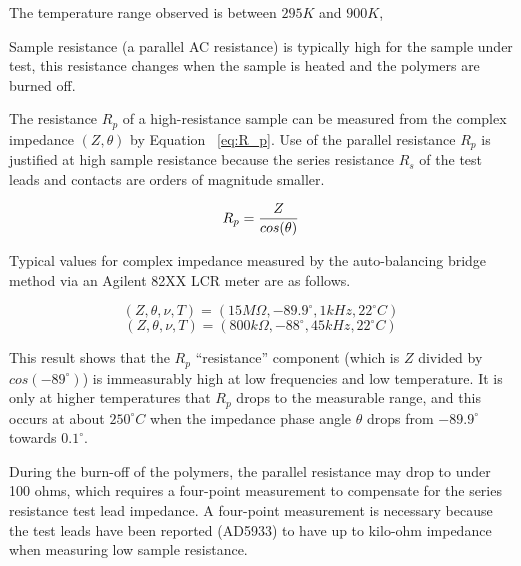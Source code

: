 \documentclass[12pt,oneside,english]{article}
\begin{document}
	The temperature range observed is between $295K$ and $900K$, 
	
	Sample resistance (a parallel AC resistance) is typically high for the sample under test, this resistance changes when the sample is heated and the polymers are burned off.  

	The resistance $R_p$ of a high-resistance sample can be measured from the complex impedance $(Z,\theta)$ by Equation ~\ref{eq:R_p}.  Use of the parallel resistance $R_p$ is justified at high sample resistance because the series resistance $R_s$ of the test leads and contacts are orders of magnitude smaller.
	
	\begin{equation}
		R_p = {{Z} \over {cos({\theta})}}
		\label{eq:R_p}
	\end{equation}
	
	Typical values for complex impedance measured by the auto-balancing bridge method via an Agilent 82XX LCR meter are as follows.
	
	\begin{equation}
		\left( Z,\theta,\nu,T \right) = \left( 15 M\Omega, -89.9^\circ, 1kHz, 22^{\circ}C \right)
	\end{equation}
	\begin{equation}
		\left( Z, \theta, \nu, T \right) = \left( 800 k\Omega, -88^\circ, 45kHz, 22^{\circ}C \right)
	\end{equation}
	
	This result shows that the $R_p$ ``resistance'' component (which is $Z$ divided by $cos(-89^\circ)$) is immeasurably high at low frequencies and low temperature.  It is only at higher temperatures that $R_p$ drops to the measurable range, and this occurs at about $250^{\circ}C$ when the impedance phase angle $\theta$ drops from $-89.9^\circ$ towards $0.1^\circ$.
	
	During the burn-off of the polymers, the parallel resistance may drop to under 100 ohms, which requires a four-point measurement to compensate for the series resistance test lead impedance.
	A four-point measurement is necessary because the test leads have been reported (AD5933) to have up to kilo-ohm impedance when measuring low sample resistance.


\clearpage


\end{document}
